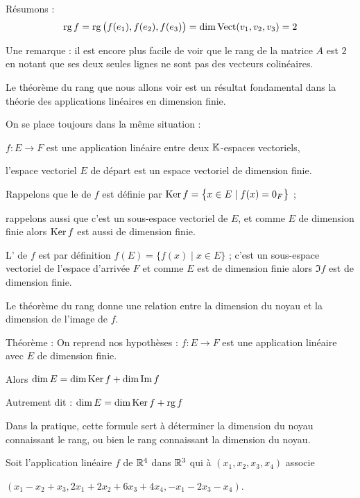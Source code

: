 Résumons : 
$$\mathop{\text{rg}}\nolimits f = \mathop{\text{rg}}\nolimits \big(f(e_1), f(e_2), f(e_3) \big) = \dim \mathop{\text{Vect}}\nolimits (v_1, v_2, v_3) = 2$$


Une remarque : il est encore plus facile de voir que le rang de la matrice $A$ est $2$ 
en notant que ses deux seules lignes ne sont pas des vecteurs colinéaires.



\diapo

Le  théorème du rang que nous allons voir est un résultat fondamental dans la théorie des 
applications linéaires en dimension finie.


On se place toujours dans la même situation : 

$f : E \to F$ est une application linéaire entre deux $\mathbb{K}$-espaces 
  vectoriels,
  
\change
l'espace vectoriel $E$ de départ est un espace vectoriel de dimension finie.
 
\change
Rappelons que le  de $f$ est définie par $\mathop{\text{Ker}}\nolimits f=\big\{x \in E \mid f(x)=0_{F}\big\}$ ;

rappelons aussi que c'est un sous-espace vectoriel de $E$, 
et comme $E$ de dimension finie alors $\mathop{\text{Ker}}\nolimits f$ est aussi de dimension finie.
  
\change
L' de $f$ est par définition $f(E) = \big\{ f(x) \mid x \in E \big\}$ ;
 c'est un sous-espace vectoriel de l'espace d'arrivée $F$ et comme $E$ est de dimension
 finie alors $\Im f$ est de dimension finie.
 
\change
Le théorème du rang donne une relation entre la
dimension du noyau et la dimension de l'image de $f$.

Théorème : 
On reprend nos hypothèses :
$f : E \to F$ est une application linéaire avec
$E$ de dimension finie. 

Alors $\dim E =\dim \mathop{\text{Ker}}\nolimits f + \dim \mathop{\text{Im}}\nolimits f$


\change
Autrement dit : $\dim E = \dim \mathop{\text{Ker}}\nolimits f + \mathop{\text{rg}}\nolimits f$

Dans la pratique, cette formule sert à déterminer la dimension du noyau
connaissant le rang, ou bien le rang connaissant la dimension du noyau.



\diapo

Soit l'application linéaire $f$ de $\mathbb{R}^4$ dans $\mathbb{R}^3$
qui à $ (x_1,x_2,x_3,x_4) $ associe 

$ (x_1-x_2+x_3,2x_1+2x_2+6x_3+4x_4,-x_1-2x_3-x_4) $.

